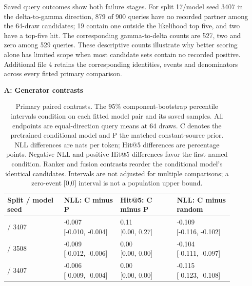 \documentclass[a4paper,11pt]{article}
\begin{document}
Saved query outcomes show both failure stages. For split 17/model seed 3407
in the delta-to-gamma direction, 879 of 900 queries have no recorded partner
among the 64-draw candidates; 19 contain one outside the likelihood top five,
and two have a top-five hit. The corresponding gamma-to-delta counts are
527, two and zero among 529 queries. These descriptive counts illustrate why
better scoring alone has limited scope when most candidate sets contain no
recorded positive. Additional file 4 retains the corresponding identities,
events and denominators across every fitted primary comparison.

\begin{table}[!htbp]
\centering
\caption{Primary paired contrasts. The 95\% component-bootstrap percentile intervals condition on each fitted model pair and its saved samples. All endpoints are equal-direction query means at 64 draws. C denotes the pretrained conditional model and P the matched constant-source prior. NLL differences are nats per token; Hit@5 differences are percentage points. Negative NLL and positive Hit@5 differences favor the first named condition. Ranker and fusion contrasts reorder the conditional model's identical candidates. Intervals are not adjusted for multiple comparisons; a zero-event [0,0] interval is not a population upper bound.}
\label{tab:paired}
\small
\setlength{\tabcolsep}{3pt}
\par\smallskip\noindent\textbf{A: Generator contrasts}\par\smallskip
\begin{tabular}{@{}>{\raggedright\arraybackslash}p{0.23\linewidth}>{\raggedright\arraybackslash}p{0.23\linewidth}>{\raggedright\arraybackslash}p{0.23\linewidth}>{\raggedright\arraybackslash}p{0.23\linewidth}@{}}
\toprule
Split / model seed & NLL: C minus P & Hit@5: C minus P & NLL: C minus random\\
\midrule
17 / 3407 & \shortstack[l]{-0.007\\{}[-0.010, -0.004]} & \shortstack[l]{0.11\\{}[0.00, 0.27]} & \shortstack[l]{-0.109\\{}[-0.116, -0.102]}\\[3pt]
17 / 3508 & \shortstack[l]{-0.009\\{}[-0.012, -0.006]} & \shortstack[l]{0.00\\{}[0.00, 0.00]} & \shortstack[l]{-0.104\\{}[-0.111, -0.097]}\\[3pt]
3407 / 3407 & \shortstack[l]{-0.006\\{}[-0.009, -0.004]} & \shortstack[l]{0.00\\{}[0.00, 0.00]} & \shortstack[l]{-0.115\\{}[-0.123, -0.108]}\\[3pt]

\end{tabular}
\end{table}
\end{document}
